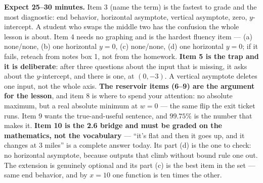 \documentclass[10pt]{article}
\begin{document}
\boxguard[18]
\begin{teachernote}[Homework]
    \textbf{Expect 25--30 minutes.} Item 3 (name the term) is the fastest to grade and the most
    diagnostic: end behavior, horizontal asymptote, vertical asymptote, zero, $y$-intercept. A student
    who swaps the middle two has the confusion the whole lesson is about. Item 4 needs no graphing and
    is the hardest fluency item --- (a) none/none, (b) one horizontal $y=0$, (c) none/none, (d) one
    horizontal $y=0$; if it fails, reteach from notes box 1, not from the homework. \textbf{Item 5 is
    the trap and it is deliberate}: after three questions about the input that is missing, it asks
    about the $y$-intercept, and there is one, at $(0,-3)$. A vertical asymptote deletes one input,
    not the whole axis. \textbf{The reservoir items (6--9) are the argument for the lesson}, and item 8
    is where to spend your attention: no absolute maximum, but a real absolute minimum at $w=0$ --- the
    same flip the exit ticket runs. Item 9 wants the true-and-useful sentence, and $99.75\%$ is the
    number that makes it. \textbf{Item 10 is the 2.6 bridge and must be graded on the mathematics, not
    the vocabulary} --- ``it's flat and then it goes up, and it changes at 3 miles'' is a complete
    answer today. Its part (d) is the one to check: no horizontal asymptote, because outputs that
    climb without bound rule one out. The extension is genuinely optional and its part (c) is the best
    item in the set --- same end behavior, and by $x=10$ one function is ten times the other.
\end{teachernote}
\end{document}
